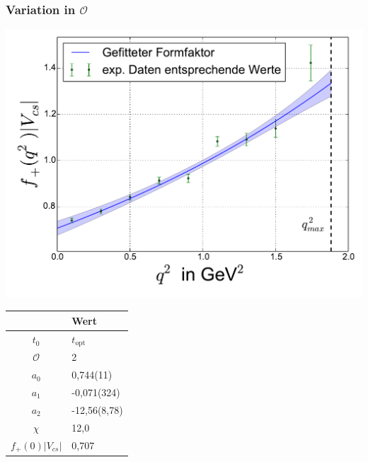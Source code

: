 \documentclass[hyperref={pdfpagelabels=false}]{beamer}
\begin{document}
\begin{frame}
 \frametitle{Variation in $\mathcal{O}$}
  \begin{minipage}[h]{0.66\textwidth}
  \includegraphics[width=1.0\textwidth]{../Fit/D+-2O-topt.pdf}
 \end{minipage}
 \begin{minipage}[h]{0.32\textwidth}
  \begin{table}[h]
   \begin{tabular}{c|l}
   \toprule
     & Wert\\
    \midrule
    $t_0$ & $t_\text{opt}$\\
    $\mathcal{O}$ & 2\\
    \midrule
    $a_0$ & 0,744(11)\\
    $a_1$ & -0,071(324)\\
    $a_2$ & -12,56(8,78)\\
    \midrule
    $\chi$ & 12,0\\
    $f_+(0)|V_{cs}|$ & 0,707\\
    \bottomrule\bottomrule
   \end{tabular}

  \end{table}

 \end{minipage}
\end{frame}
\end{document}
